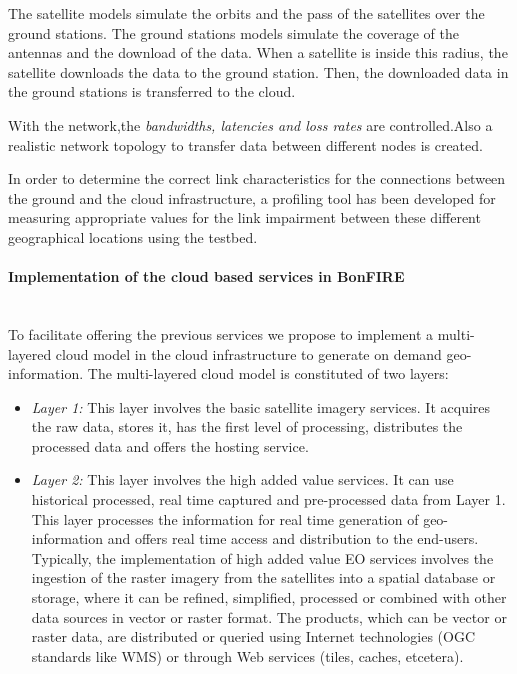 The satellite models simulate the orbits and the pass of the satellites over the
ground stations. The ground stations models simulate the coverage of the
antennas and the download of the data. When a satellite is inside this radius,
the satellite downloads the data to the ground station. Then, the downloaded data in the ground stations is transferred to the \bonfire cloud.

With the \vw network,the \emph{bandwidths, latencies and loss rates} are
controlled.Also a realistic network topology to transfer data between different
nodes is created.

In order to determine the correct link characteristics for the connections
between the ground and the cloud infrastructure, a profiling tool has been
developed for measuring appropriate values for the link impairment between these different geographical locations using the \pl testbed.


\paragraph{Implementation of the cloud based services in BonFIRE}~\\
To facilitate offering the previous services we propose to implement a multi-layered cloud model in the \bonfire cloud infrastructure to generate on demand geo-information. The multi-layered cloud model is constituted of two layers:
\begin{itemize}
\item \emph{Layer 1:} This layer involves the basic satellite imagery services.  It acquires the raw data, stores it, has the first level of processing, distributes the processed data and offers the hosting service.

\item \emph{Layer 2:} This layer involves the high added value services. It can use historical processed, real time captured and pre-processed data from Layer 1. This layer processes the information for real time generation of geo-information and offers real time access and distribution to the end-users. Typically, the implementation of high added value EO services involves the ingestion of the raster imagery from the satellites into a spatial database or storage, where it can be refined, simplified, processed or combined with other data sources in vector or raster format. The products, which can be vector or raster data, are distributed or queried using Internet technologies (\ac{OGC} standards like \ac{WMS}) or through Web services (tiles, caches, etcetera).
\end{itemize}

